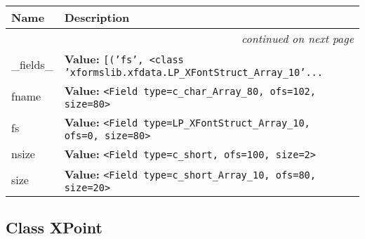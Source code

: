     \vspace{-1cm}
\hspace{\varindent}\begin{longtable}{|p{\varnamewidth}|p{\vardescrwidth}|l}
\cline{1-2}
\cline{1-2} \centering \textbf{Name} & \centering \textbf{Description}& \\
\cline{1-2}
\endhead\cline{1-2}\multicolumn{3}{r}{\small\textit{continued on next page}}\\\endfoot\cline{1-2}
\endlastfoot\raggedright \_\-f\-i\-e\-l\-d\-s\-\_\- & \raggedright \textbf{Value:} 
{\tt \texttt{[}\texttt{(}\texttt{'}\texttt{fs}\texttt{'}\texttt{, }{\textless}class 'xformslib.xfdata.LP\_XFontStruct\_Array\_10'\texttt{...}}&\\
\cline{1-2}
\raggedright f\-n\-a\-m\-e\- & \raggedright \textbf{Value:} 
{\tt {\textless}Field type=c\_char\_Array\_80, ofs=102, size=80{\textgreater}}&\\
\cline{1-2}
\raggedright f\-s\- & \raggedright \textbf{Value:} 
{\tt {\textless}Field type=LP\_XFontStruct\_Array\_10, ofs=0, size=80{\textgreater}}&\\
\cline{1-2}
\raggedright n\-s\-i\-z\-e\- & \raggedright \textbf{Value:} 
{\tt {\textless}Field type=c\_short, ofs=100, size=2{\textgreater}}&\\
\cline{1-2}
\raggedright s\-i\-z\-e\- & \raggedright \textbf{Value:} 
{\tt {\textless}Field type=c\_short\_Array\_10, ofs=80, size=20{\textgreater}}&\\
\cline{1-2}
\end{longtable}



\subsection{Class XPoint}

